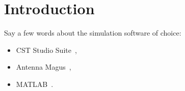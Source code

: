 \documentclass[11pt,a4paper,twoside,openany]{report}
\begin{document}

\begin{titlepage}
    
\end{titlepage}

\newpage\blankpage




% 

% 

% 


\tableofcontents

\listoffigures

\chapter*{Introduction}
\label{chapter:introduction}

\lipsum[1-2]

Say a few words about the simulation software of choice:
\begin{itemize}
    \item CST Studio Suite~\parencite{cst},
    \item Antenna Magus~\parencite{antenna-magus},
    \item MATLAB~\parencite{matlab}.
\end{itemize}

\end{document}
